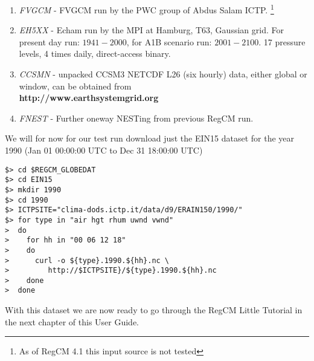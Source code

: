 \begin{enumerate}
Pressure levels, 1.0x1.0L27, 4 times daily.
\item {\em FVGCM} - FVGCM run by the PWC group of Abdus Salam ICTP.
\footnote{As of RegCM 4.1 this input source is not tested}
\item {\em EH5XX} - Echam run by the MPI at Hamburg, T63, Gaussian grid.
For present day  run: $1941 - 2000$, for A1B scenario run: $2001 - 2100$. 
17 pressure levels, 4 times daily, direct-access binary.
\item {\em CCSMN} - unpacked CCSM3 NETCDF L26 (six hourly) data, either global
or window, can be obtained from \\ {\bf http://www.earthsystemgrid.org}
\item {\em FNEST} - Further oneway NESTing from previous RegCM run.
\end{enumerate}

We will for now for our test run download just the EIN15 dataset for the
year 1990 (Jan 01 00:00:00 UTC to Dec 31 18:00:00 UTC)

\begin{Verbatim}
$> cd $REGCM_GLOBEDAT
$> cd EIN15
$> mkdir 1990
$> cd 1990
$> ICTPSITE="clima-dods.ictp.it/data/d9/ERAIN150/1990/"
$> for type in "air hgt rhum uwnd vwnd"
>  do
>    for hh in "00 06 12 18"
>    do
>      curl -o ${type}.1990.${hh}.nc \
>         http://$ICTPSITE}/${type}.1990.${hh}.nc
>    done
>  done
\end{Verbatim}

With this dataset we are now ready to go through the RegCM Little Tutorial
in the next chapter of this User Guide.
